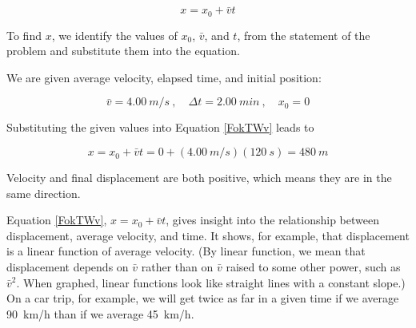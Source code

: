 \documentclass[../../main-ap-physics.tex]{subfiles}
\begin{document}
\begin{equation*}
    x = x_0 + \bar{v} t
\end{equation*}

To find $x$, we identify the values of $x_0$, $\bar{v}$, and $t$, from the statement of the problem and substitute them into the equation.

\vspace{1em}

We are given average velocity, elapsed time, and initial position: 

\begin{equation*}
    \bar{v} = \SI{4.00}{m/s}\ , \quad \Delta t = \SI{2.00}{min}\ , \quad x_0 = 0
\end{equation*}

Substituting the given values into Equation \eqref{FokTWv} leads to 

\begin{equation*}
    x = x_0 + \bar{v} t = 0 + \left(\SI{4.00}{m/s}\right) \left(\SI{120}{s}\right) = \SI{480}{m}
\end{equation*}

Velocity and final displacement are both positive, which means they are in the same direction.

\endsolution

Equation \eqref{FokTWv}, $x = x_0 + \bar{v} t$, gives insight into the relationship between displacement, average velocity, and time. It shows, for example, that displacement is a linear function of average velocity. (By linear function, we mean that displacement depends on $\bar{v}$ rather than on $\bar{v}$ raised to some other power, such as $\bar{v}^2$. When graphed, linear functions look like straight lines with a constant slope.) On a car trip, for example, we will get twice as far in a given time if we average \SI{90}{km/h} than if we average \SI{45}{km/h}.


\begin{center}
\captionsetup{type=figure,margin=1in,font=scriptsize}
\end{center}
\end{document}
